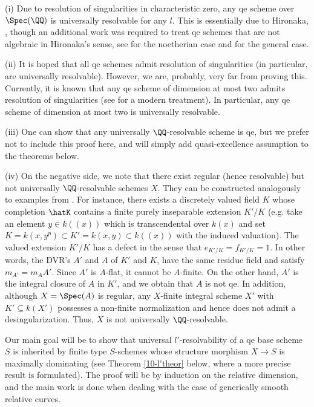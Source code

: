 \documentclass[10pt]{../fichiers-configuration-latex/smfart}
\begin{document}
\begin{remark2}
(i) Due to resolution of singularities in characteristic zero, any qe scheme over
$\Spec(\QQ)$ is universally resolvable for any $l$. This is essentially due to
Hironaka, \cite{Hironaka}, though an additional work was required to treat qe
schemes that are not algebraic in Hironaka's sense, see \cite{Temkin@des1} for
the noetherian case and \cite{Temkin@des2} for the general case.

(ii) It is hoped that all qe schemes admit resolution of singularities
(in particular, are universally resolvable). However, we are, probably,
very far from proving this. Currently, it is known that any qe scheme of
dimension at most two admits resolution of singularities (see \cite{CJS@surfaces}
for a modern treatment). In particular, any qe scheme of dimension at most two is
universally resolvable.

(iii) One can show that any universally $\QQ$-resolvable scheme is qe, but we
prefer not to include this proof here, and will simply add quasi-excellence
assumption to the theorems below.

(iv) On the negative side, we note that there exist regular (hence resolvable)
but not universally $\QQ$-resolvable schemes $X$. They can be constructed analogously
to examples from . For instance, there exists a discretely valued
field $K$ whose completion $\hatK$ contains a finite purely inseparable extension $K'/K$
(e.g. take an element $y\in k((x))$ which is transcendental over $k(x)$ and set
$K=k(x,y^p)\subset  K' = k(x,y) \subset k((x))$ with the induced valuation).
The valued extension $K'/K$ has a defect in the sense that $e_{K'/K}=f_{K'/K}=1$.
In other words, the DVR's $A'$ and $A$ of $K'$ and $K$, have the same residue field
and satisfy $m_{A'}=m_AA'$. Since $A'$ is $A$-flat, it cannot be $A$-finite. On the
other hand, $A'$ is the integral closure of $A$ in $K'$, and we obtain that $A$ is
not qe. In addition, although $X=\Spec(A)$ is regular, any $X$-finite integral scheme
$X'$ with $K'\subseteq k(X')$ possesses a non-finite normalization and hence does not
admit a desingularization. Thus, $X$ is not universally $\QQ$-resolvable.
\end{remark2}

Our main goal will be to show that universal $l'$-resolvability of a qe base scheme
$S$ is inherited by finite type $S$-schemes whose structure morphism $X\to S$ is
maximally dominating (see Theorem \ref{10-l'theor} below, where a more precise
result is formulated). The proof will be by induction on the relative dimension,
and the main work is done when dealing with the case of generically smooth relative curves.
\end{document}
